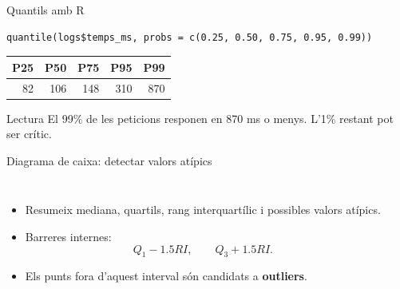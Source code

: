 \documentclass[10pt,aspectratio=169]{beamer}
\newcommand{\important}[1]{\textcolor{UABGreen}{\textbf{#1}}}
\begin{document}
\begin{frame}[fragile]{Quantils amb R}
\begin{lstlisting}
quantile(logs$temps_ms, probs = c(0.25, 0.50, 0.75, 0.95, 0.99))
\end{lstlisting}
\vspace{0.25cm}
\begin{center}
\small
\begin{tabular}{rrrrr}
\toprule
P25 & P50 & P75 & P95 & P99 \\
\midrule
82 & 106 & 148 & 310 & 870 \\
\bottomrule
\end{tabular}
\end{center}
\vspace{0.15cm}
\begin{block}{Lectura}
El 99\% de les peticions responen en 870 ms o menys. L'1\% restant pot ser crític.
\end{block}
\end{frame}

\begin{frame}{Diagrama de caixa: detectar valors atípics}
\begin{columns}[T]
\begin{itemize}
  \item Resumeix mediana, quartils, rang interquartílic i possibles valors atípics.
  \item Barreres internes:
  \[
  Q_1-1.5RI, \qquad Q_3+1.5RI.
  \]
  \item Els punts fora d'aquest interval són candidats a \important{outliers}.
\end{itemize}
\end{columns}
\end{frame}
\end{document}
